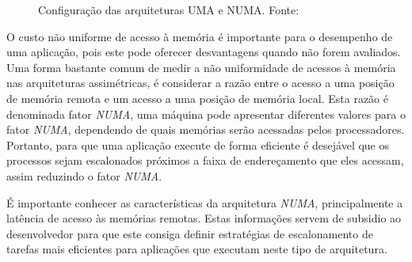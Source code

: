 \documentclass[diss,capa]{texufpel}
\begin{document}
\begin{figure}[!htp]
\centering
{}
\caption{Configuração das arquiteturas UMA e NUMA. Fonte:~\cite{Rodolfo:2014}}
\label{arquiteturas_config}
\end{figure}

O custo não uniforme de acesso à memória é importante para o desempenho de uma aplicação, pois este pode oferecer desvantagens quando não forem avaliados. Uma forma bastante comum de medir a não uniformidade de acessos à memória nas arquiteturas assimétricas, é considerar a razão entre o acesso a uma posição de memória remota e um acesso a uma posição de memória local. Esta razão é denominada fator \emph{NUMA}, uma máquina pode apresentar diferentes valores para o fator \emph{NUMA}, dependendo de quais memórias serão acessadas pelos processadores. Portanto, para que uma aplicação execute de forma eficiente é desejável que os processos sejam escalonados próximos a faixa de endereçamento que eles acessam, assim reduzindo o fator \emph{NUMA}.

É importante conhecer as características da arquitetura \emph{NUMA}, principalmente a latência de acesso às memórias remotas. Estas informações servem de subsidio ao desenvolvedor para que este consiga definir estratégias de escalonamento de tarefas mais eficientes para aplicações que executam neste tipo de arquitetura.
\end{document}
